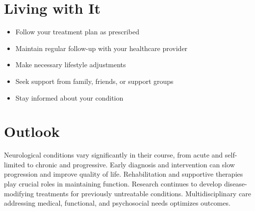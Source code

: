 \section{Living with It}
\begin{itemize}[noitemsep]
  \item Follow your treatment plan as prescribed
  \item Maintain regular follow-up with your healthcare provider
  \item Make necessary lifestyle adjustments
  \item Seek support from family, friends, or support groups
  \item Stay informed about your condition
\end{itemize}
\section{Outlook}
Neurological conditions vary significantly in their course, from acute and self-limited to chronic and progressive. Early diagnosis and intervention can slow progression and improve quality of life. Rehabilitation and supportive therapies play crucial roles in maintaining function. Research continues to develop disease-modifying treatments for previously untreatable conditions. Multidisciplinary care addressing medical, functional, and psychosocial needs optimizes outcomes.
